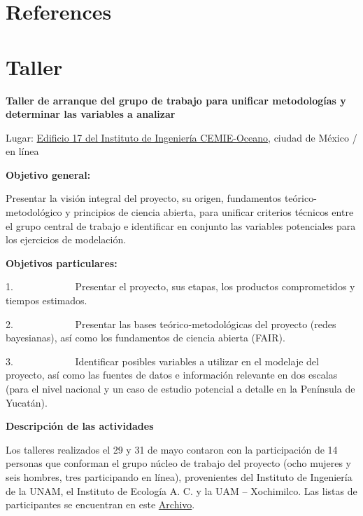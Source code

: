 \documentclass[
  letterpaper,
  DIV=11,
  numbers=noendperiod]{scrreprt}
\newlength{\cslhangindent}
\newlength{\cslentryspacingunit} %
\newenvironment{CSLReferences}[2] %
 {%
  \setlength{\parindent}{0pt}
  \ifodd #1
  \let\oldpar\par
  \def\par{\hangindent=\cslhangindent\oldpar}
  \fi
  \setlength{\parskip}{#2\cslentryspacingunit}
 }%
 {}
\begin{document}

\hypertarget{references}{%
\chapter*{References}\label{references}}


\hypertarget{refs}{}
\begin{CSLReferences}{0}{0}
\end{CSLReferences}


\hypertarget{taller}{%
\chapter{Taller}\label{taller}}

\textbf{Taller de arranque del grupo de trabajo para unificar
metodologías y determinar las variables a analizar}

Lugar: \href{https://maps.app.goo.gl/hCVkgx3S4XdrRimm7}{Edificio 17 del
Instituto de Ingeniería CEMIE-Oceano}, ciudad de México / en línea

\textbf{Objetivo general:}

Presentar la visión integral del proyecto, su origen, fundamentos
teórico-metodológico y principios de ciencia abierta, para unificar
criterios técnicos entre el grupo central de trabajo e identificar en
conjunto las variables potenciales para los ejercicios de modelación.

\textbf{Objetivos particulares:}

1.~~~~~~~~~~~~ Presentar el proyecto, sus etapas, los productos
comprometidos y tiempos estimados.

2.~~~~~~~~~~~~ Presentar las bases teórico-metodológicas del proyecto
(redes bayesianas), así como los fundamentos de ciencia abierta (FAIR).

3.~~~~~~~~~~~~ Identificar posibles variables a utilizar en el modelaje
del proyecto, así como las fuentes de datos e información relevante en
dos escalas (para el nivel nacional y un caso de estudio potencial a
detalle en la Península de Yucatán).

\textbf{Descripción de las actividades}

Los talleres realizados el 29 y 31 de mayo contaron con la participación
de 14 personas que conforman el grupo núcleo de trabajo del proyecto
(ocho mujeres y seis hombres, tres participando en línea), provenientes
del Instituto de Ingeniería de la UNAM, el Instituto de Ecología A. C. y
la UAM -- Xochimilco. Las listas de participantes se encuentran en este
\href{Taller/Anexo\%201\%20Lista\%20de\%20participantes.pdf}{Archivo}.
\end{document}
